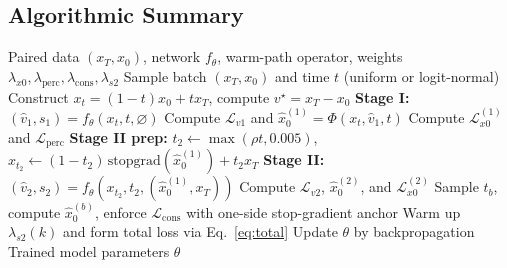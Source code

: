 \subsection{Algorithmic Summary}
\label{subsec:algorithm}
\begin{algorithm}[t]
\caption{Endpoint-Consistent EMM-RF Training}
\label{alg:emm_rf}
\begin{algorithmic}[1]
\REQUIRE Paired data $(x_T,x_0)$, network $f_{\theta}$, warm-path operator, weights $\lambda_{x0},\lambda_{\mathrm{perc}},\lambda_{\mathrm{cons}},\lambda_{s2}$
  \STATE Sample batch $(x_T,x_0)$ and time $t$ (uniform or logit-normal)
  \STATE Construct $x_t=(1-t)x_0+tx_T$, compute $v^{\star}=x_T-x_0$
  \STATE \textbf{Stage I:} $(\hat v_1,s_1)=f_{\theta}(x_t,t,\varnothing)$
  \STATE Compute $\mathcal{L}_{v1}$ and $\hat x_0^{(1)}=\Phi(x_t,\hat v_1,t)$
  \STATE Compute $\mathcal{L}_{x0}^{(1)}$ and $\mathcal{L}_{\mathrm{perc}}$
  \STATE \textbf{Stage II prep:} $t_2\leftarrow\max(\rho t,0.005)$, $x_{t_2}\leftarrow(1-t_2)\,\mathrm{stopgrad}(\hat x_0^{(1)})+t_2x_T$
  \STATE \textbf{Stage II:} $(\hat v_2,s_2)=f_{\theta}(x_{t_2},t_2,(\hat x_0^{(1)},x_T))$
  \STATE Compute $\mathcal{L}_{v2}$, $\hat x_0^{(2)}$, and $\mathcal{L}_{x0}^{(2)}$
  \STATE Sample $t_b$, compute $\hat x_0^{(b)}$, enforce $\mathcal{L}_{\mathrm{cons}}$ with one-side stop-gradient anchor
  \STATE Warm up $\lambda_{s2}(k)$ and form total loss via Eq.~\eqref{eq:total}
  \STATE Update $\theta$ by backpropagation
\ENDFOR
\RETURN Trained model parameters $\theta$
\end{algorithmic}
\end{algorithm}
